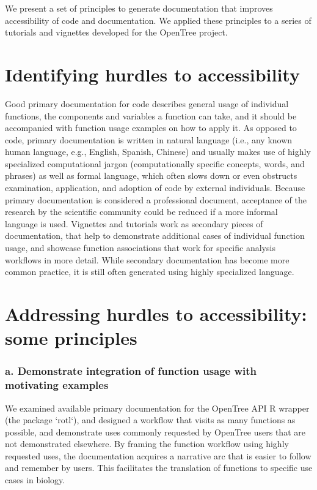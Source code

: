 \documentclass[12pt]{article}
\begin{document}
We present a set of principles to generate documentation that improves accessibility
 of code and documentation. We applied these principles to a series of tutorials
  and vignettes developed for the OpenTree project.

\section*{Identifying hurdles to accessibility}
\label{sec:identifying}

Good primary documentation for code describes general usage of individual functions,
 the components and variables a function can take, and it should be accompanied with
  function usage examples on how to apply it.
As opposed to code, primary documentation is written in natural language (i.e.,
 any known human language, e.g., English, Spanish, Chinese) and usually makes use
  of highly specialized computational jargon (computationally specific concepts,
   words, and phrases) as well as formal language, which often slows down or even
    obstructs examination, application, and adoption of code by external individuals.
Because primary documentation is considered a professional document, acceptance
 of the research by the scientific community could be reduced if a more informal
  language is used.
Vignettes and tutorials work as secondary pieces of documentation, that help to demonstrate
 additional cases of individual function usage, and showcase function associations
  that work for specific analysis workflows in more detail.
   While secondary documentation has become more common practice,
    it is still often generated using highly specialized language.

\section*{Addressing hurdles to accessibility: some principles}
\label{sec:addressing}

\subsubsection*{a. Demonstrate integration of function usage with motivating examples}

We examined available primary documentation for the OpenTree API R wrapper (the package `rotl`),
and designed a workflow that visits as many functions as possible, and demonstrate
uses commonly requested by OpenTree users that are not demonstrated elsewhere.
By framing the function workflow using highly requested uses, the documentation acquires a
narrative arc that is easier to follow and remember by users. This facilitates the translation
of functions to specific use cases in biology.
\end{document}
